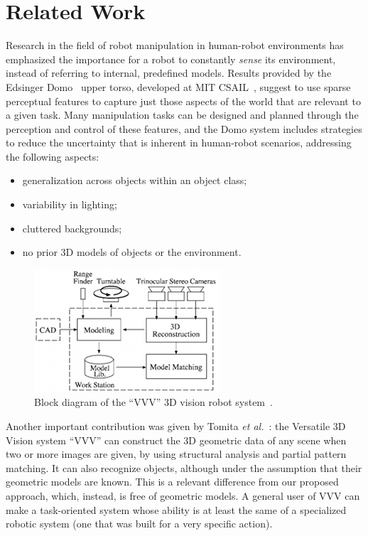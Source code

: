 
\chapter{Related Work}
\label{chap:related_work}

Research in the field of robot manipulation in human-robot environments has emphasized the importance for a robot to constantly \emph{sense} its environment, instead of referring to internal, predefined models. Results provided by the Edsinger Domo~\cite{link:domo} upper torso, developed at MIT CSAIL~\cite{link:csail}, suggest to use sparse perceptual features to capture just those aspects of the world that are relevant to a given task. Many manipulation tasks can be designed and planned through the perception and control of these features, and the Domo system includes strategies to reduce the uncertainty that is inherent in human-robot scenarios, addressing the following aspects:
\begin{itemize}
\item generalization across objects within an object class;

\item variability in lighting;

\item cluttered backgrounds;

\item no prior 3D models of objects or the environment.
\end{itemize}

\begin{figure}
\centering
\includegraphics{figures/vvv}
\caption[Block diagram of VVV]{Block diagram of the ``VVV'' 3D vision robot system~\cite{sumi:2002}.}
\label{img:vvv}
\end{figure}

Another important contribution was given by Tomita \emph{et al.}~\cite{tomita:1998}: the Versatile 3D Vision system ``VVV'' can construct the 3D geometric data of any scene when two or more images are given, by using structural analysis and partial pattern matching. It can also recognize objects, although under the assumption that their geometric models are known. This is a relevant difference from our proposed approach, which, instead, is free of geometric models. A general user of VVV can make a task-oriented system whose ability is at least the same of a specialized robotic system (one that was built for a very specific action).

